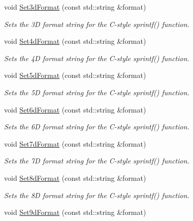 \begin{DoxyCompactItemize}
void \hyperlink{classns3_1_1FileAggregator_a96b4b58b8415bd2658baf5a197aa5d51}{Set3d\+Format} (const std\+::string \&format)
\begin{DoxyCompactList}\small\item\em Sets the 3D format string for the C-\/style sprintf() function. \end{DoxyCompactList}\item 
void \hyperlink{classns3_1_1FileAggregator_a0e0ad9856d511c39b1c5597502621efa}{Set4d\+Format} (const std\+::string \&format)
\begin{DoxyCompactList}\small\item\em Sets the 4D format string for the C-\/style sprintf() function. \end{DoxyCompactList}\item 
void \hyperlink{classns3_1_1FileAggregator_aafef79312c2b043334c723238fc5ddb4}{Set5d\+Format} (const std\+::string \&format)
\begin{DoxyCompactList}\small\item\em Sets the 5D format string for the C-\/style sprintf() function. \end{DoxyCompactList}\item 
void \hyperlink{classns3_1_1FileAggregator_a23174d48f70cec319f40297f7c9c38f1}{Set6d\+Format} (const std\+::string \&format)
\begin{DoxyCompactList}\small\item\em Sets the 6D format string for the C-\/style sprintf() function. \end{DoxyCompactList}\item 
void \hyperlink{classns3_1_1FileAggregator_a42d1800e42ad2bb619db6c2c2d87c637}{Set7d\+Format} (const std\+::string \&format)
\begin{DoxyCompactList}\small\item\em Sets the 7D format string for the C-\/style sprintf() function. \end{DoxyCompactList}\item 
void \hyperlink{classns3_1_1FileAggregator_a3b8e7aef863813fd03aca28ec471bbfd}{Set8d\+Format} (const std\+::string \&format)
\begin{DoxyCompactList}\small\item\em Sets the 8D format string for the C-\/style sprintf() function. \end{DoxyCompactList}\item 
void \hyperlink{classns3_1_1FileAggregator_a70a94adb4402f326a300d4a5a323aea1}{Set9d\+Format} (const std\+::string \&format)

\end{DoxyCompactItemize}
